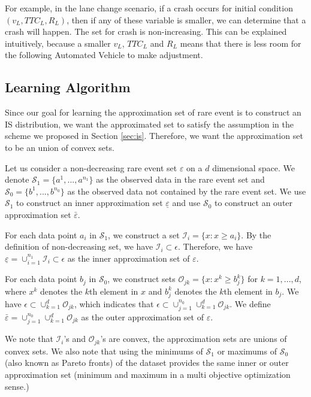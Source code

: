 \documentclass[conference]{IEEEtran}
\begin{document}
For example, in the lane change scenario, if a crash occurs for initial condition $(v_L, TTC_L, R_L)$, then if any of these variable is smaller, we can determine that a crash will happen. The set for crash is non-increasing. This can be explained intuitively, because a smaller $v_L$, $TTC_L$ and $R_L$ means that there is less room for the following Automated Vehicle to make adjustment.



\subsection{Learning Algorithm}

Since our goal for learning the approximation set of rare event is to construct an IS distribution, we want the approximated set to satisfy the assumption in the scheme we proposed in Section \ref{sec:is}. Therefore, we want the approximation set to be an union of convex sets.

Let us consider a non-decreasing rare event set $\varepsilon $ on a $d$ dimensional space. We denote $\mathcal{S}_1=\{a^1,...,a^{n_1}\}$ as the observed data in the rare event set and $\mathcal{S}_0=\{b^1,...,b^{n_0}\}$ as the observed data not contained by the rare event set. We use $\mathcal{S}_1$ to construct an inner approximation set $\underline{\varepsilon}$ and use $\mathcal{S}_0$ to construct an outer approximation set $\bar{\varepsilon}$. 

For each data point $a_i$ in $\mathcal{S}_1$, we construct a set $\mathcal{I}_i=\{x:x \geq a_i\}$. By the definition of non-decreasing set, we have $\mathcal{I}_i \subset \epsilon$. Therefore, we have $\underline{\varepsilon}= \cup_{i=1}^{n_1} \mathcal{I}_i \subset \epsilon$ as the inner approximation set of $\varepsilon $.


 For each data point $b_j$ in $\mathcal{S}_0$, we construct sets $\mathcal{O}_{jk}=\{x:x^k \geq b^k_j\} $ for $k=1,...,d$, where $x^k$ denotes the $k$th element in $x$ and $b^k_j$ denotes the $k$th element in $b_j$. We have $\epsilon \subset \cup_{k=1}^{d} \mathcal{O}_{jk}$, which indicates that $\epsilon \subset \cup_{j=1}^{n_0} \cup_{k=1}^{d} \mathcal{O}_{jk}$. We define $\bar{\varepsilon} = \cup_{j=1}^{n_0} \cup_{k=1}^{d} \mathcal{O}_{jk}$ as the outer approximation set of $\varepsilon $.

We note that $\mathcal{I}_i$'s and $\mathcal{O}_{jk}$'s are convex, the approximation sets are unions of convex sets. We also note that using the minimums of $\mathcal{S}_1$ or maximums of $\mathcal{S}_0$ (also known as Pareto fronts) of the dataset provides the same inner or outer approximation set (minimum and maximum in a multi objective optimization sense.)
\end{document}
